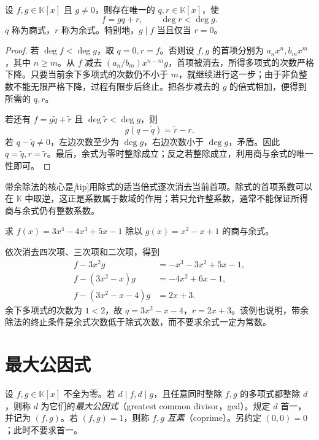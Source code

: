 \begin{theorem}[带余除法]
\label{thm:polynomial-division}
设 $f,g\in\mathbb K[x]$ 且 $g\ne0$，则存在唯一的 $q,r\in\mathbb K[x]$，使
\begin{equation}
\label{eq:polynomial-division}
    f=gq+r,\qquad \deg r<\deg g.
\end{equation}
$q$ 称为商式，$r$ 称为余式。特别地，$g\mid f$ 当且仅当 $r=0$。
\end{theorem}
\begin{proof}
若 $\deg f<\deg g$，取 $q=0,r=f$。否则设 $f,g$ 的首项分别为 $a_nx^n,b_mx^m$，其中 $n\geq m$。从 $f$ 减去 $(a_n/b_m)x^{n-m}g$，首项被消去，所得多项式的次数严格下降。只要当前余下多项式的次数仍不小于 $m$，就继续进行这一步；由于非负整数不能无限严格下降，过程有限步后终止。把各步减去的 $g$ 的倍式相加，便得到所需的 $q,r$。

若还有 $f=g\widetilde q+\widetilde r$ 且 $\deg\widetilde r<\deg g$，则
\[
    g(q-\widetilde q)=\widetilde r-r.
\]
若 $q-\widetilde q\ne0$，左边次数至少为 $\deg g$，右边次数小于 $\deg g$，矛盾。因此 $q=\widetilde q,r=\widetilde r$。最后，余式为零时整除成立；反之若整除成立，利用商与余式的唯一性即可。
\end{proof}

带余除法的核心是\emph[tip]{用除式的适当倍式逐次消去当前首项}。除式的首项系数可以在 $\mathbb K$ 中取逆，这正是系数属于数域的作用；若只允许整系数，通常不能保证所得商与余式仍有整数系数。

\begin{example}
求 $f(x)=3x^4-4x^3+5x-1$ 除以 $g(x)=x^2-x+1$ 的商与余式。
\end{example}
\begin{solve}
依次消去四次项、三次项和二次项，得到
\[
\begin{aligned}
    f-3x^2g&=-x^3-3x^2+5x-1,\\
    f-(3x^2-x)g&=-4x^2+6x-1,\\
    f-(3x^2-x-4)g&=2x+3.
\end{aligned}
\]
余下多项式的次数为 $1<2$，故 $q=3x^2-x-4$，$r=2x+3$。该例也说明，带余除法的终止条件是余式次数低于除式次数，而不要求余式一定为常数。
\end{solve}

\section{最大公因式}
\label{sec:polynomial-gcd}

\begin{definition}
设 $f,g\in\mathbb K[x]$ 不全为零。若 $d\mid f,d\mid g$，且任意同时整除 $f,g$ 的多项式都整除 $d$，则称 $d$ 为它们的\emph{最大公因式}（greatest common divisor，gcd）。规定 $d$ 首一，并记为 $(f,g)$。若 $(f,g)=1$，则称 $f,g$ \emph{互素}（coprime）。另约定 $(0,0)=0$；此时不要求首一。
\end{definition}

